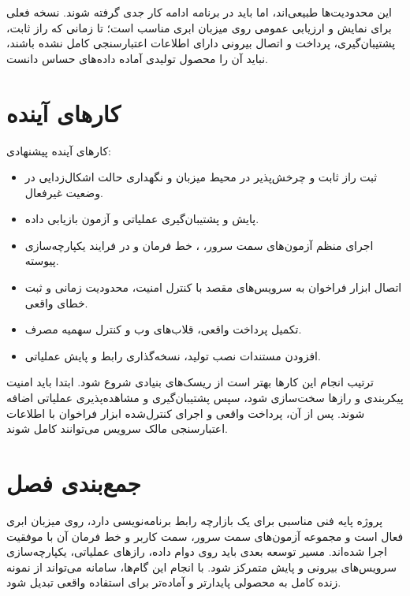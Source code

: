این محدودیت‌ها طبیعی‌اند، اما باید در برنامه ادامه کار جدی گرفته شوند. نسخه فعلی برای نمایش و ارزیابی عمومی روی میزبان ابری مناسب است؛ تا زمانی که راز ثابت، پشتیبان‌گیری، پرداخت و اتصال بیرونی دارای اطلاعات اعتبارسنجی کامل نشده باشند، نباید آن را محصول تولیدی آماده داده‌های حساس دانست.

\section{کارهای آینده}
کارهای آینده پیشنهادی:
\begin{itemize}
  \item ثبت راز ثابت و چرخش‌پذیر در محیط میزبان و نگهداری حالت اشکال‌زدایی در وضعیت غیرفعال.
  \item پایش و پشتیبان‌گیری عملیاتی  و آزمون بازیابی داده.
  \item اجرای منظم آزمون‌های سمت سرور، ، خط فرمان و  در فرایند یکپارچه‌سازی پیوسته.
  \item اتصال ابزار فراخوان به سرویس‌های مقصد با کنترل امنیت، محدودیت زمانی و ثبت خطای واقعی.
  \item تکمیل پرداخت واقعی، قلاب‌های وب و کنترل سهمیه مصرف.
  \item افزودن مستندات نصب تولید، نسخه‌گذاری رابط و پایش عملیاتی.
\end{itemize}

ترتیب انجام این کارها بهتر است از ریسک‌های بنیادی شروع شود. ابتدا باید امنیت پیکربندی و رازها سخت‌سازی شود، سپس پشتیبان‌گیری  و مشاهده‌پذیری عملیاتی اضافه شوند. پس از آن، پرداخت واقعی و اجرای کنترل‌شده ابزار فراخوان با اطلاعات اعتبارسنجی مالک سرویس می‌توانند کامل شوند.

\section{جمع‌بندی فصل}
پروژه پایه فنی مناسبی برای یک بازارچه رابط برنامه‌نویسی دارد، روی میزبان ابری فعال است و مجموعه آزمون‌های سمت سرور، سمت کاربر و خط فرمان آن با موفقیت اجرا شده‌اند. مسیر توسعه بعدی باید روی دوام داده، رازهای عملیاتی، یکپارچه‌سازی سرویس‌های بیرونی و پایش متمرکز شود. با انجام این گام‌ها، سامانه می‌تواند از نمونه زنده کامل به محصولی پایدارتر و آماده‌تر برای استفاده واقعی تبدیل شود.
